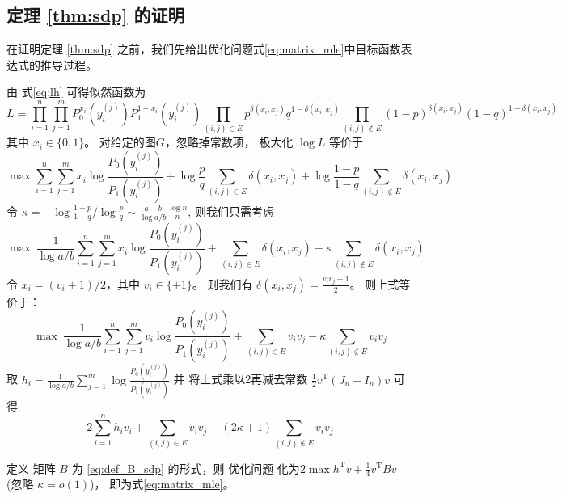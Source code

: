 \subsection{定理 \ref{thm:sdp} 的证明}
\label{sec:thm_sdp_proof}
在证明定理 \ref{thm:sdp}  之前，我们先给出优化问题式\eqref{eq:matrix_mle}中目标函数表达式的推导过程。

由 式\eqref{eq:lh} 可得似然函数为
$$
L=\prod_{i=1}^n \prod_{j=1}^m P_0^{x_i}(y_i^{(j)})P_1^{1-x_i}(y_i^{(j)})
\prod_{(i,j) \in E} p^{\delta(x_i, x_j)}q^{1-\delta(x_i, x_j)}
\prod_{(i,j)\not\in E} (1-p)^{\delta(x_i, x_j)}(1-q)^{1-\delta(x_i, x_j)}
$$
其中 $x_i \in \{0,1\}$。
对给定的图$G$，忽略掉常数项， 极大化 $ \log L$ 等价于
$$
\max \sum_{i=1}^n \sum_{j=1}^m x_i \log \frac{P_0(y_i^{(j)})}{P_1(y_i^{(j)})}
+\log\frac{p}{q}\sum_{(i,j) \in E} \delta(x_i, x_j)
+\log \frac{1-p}{1-q}\sum_{(i,j)\not\in E} \delta(x_i, x_j)
$$
令 $\kappa = -\log\frac{1-p}{1-q} / \log\frac{p}{q} \sim \frac{a-b}{\log a/b}\frac{\log n}{n}$,
则我们只需考虑
$$
\max\  \frac{1}{\log a/b}\sum_{i=1}^n \sum_{j=1}^m x_i \log \frac{P_0(y_i^{(j)})}{P_1(y_i^{(j)})}
+\sum_{(i,j) \in E} \delta(x_i, x_j)
-\kappa\sum_{(i,j)\not\in E} \delta(x_i, x_j)
$$
令 $x_i = (v_i+1)/2$，其中 $v_i \in \{\pm 1 \}$。
则我们有 $\delta(x_i, x_j) = \frac{v_i v_j + 1}{2}$。
则上式等价于：
$$
\max\  \frac{1}{\log a/b}\sum_{i=1}^n \sum_{j=1}^m v_i \log \frac{P_0(y_i^{(j)})}{P_1(y_i^{(j)})}
+\sum_{(i,j) \in E} v_i v_j
-\kappa\sum_{(i,j)\not\in E} v_i v_j
$$
取 $h_i = \frac{1}{\log a/b}\sum_{j=1}^m \log \frac{P_0(y_i^{(j)})}{P_1(y_i^{(j)})}$
并
将上式乘以2再减去常数 $\frac{1}{2}v^{\mathrm{T}}(J_n-I_n)v$ 可得
$$
2\sum_{i=1}^n h_iv_i + \sum_{(i,j)\in E} v_i v_j - (2\kappa+1) \sum_{(i,j)\not\in E} v_i v_j
$$

定义 矩阵 $B$ 为 \eqref{eq:def_B_sdp} 的形式，则
优化问题 化为$2\max h^{\mathrm{T}} v + \frac{1}{4}v^{\mathrm{T}} B v$ (忽略 $\kappa=o(1)$)，
即为式\eqref{eq:matrix_mle}。

